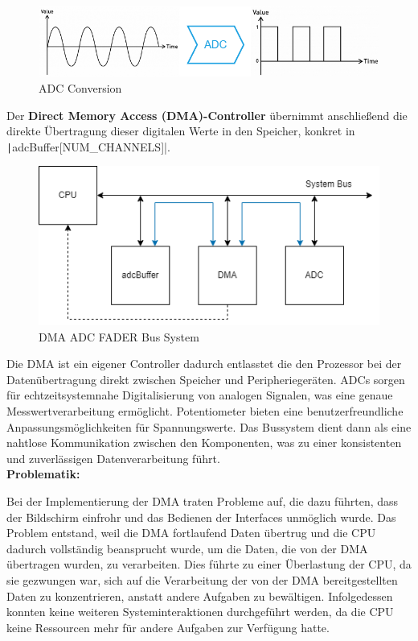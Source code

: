 \begin{figure}[H]
	\centering
	\includegraphics[width=1.0\textwidth]{images/08_durchfuehrung/interface/Conversion.drawio.png}
	\caption{ADC Conversion}
	\label{fig:conversion}
\end{figure}

Der \textbf{Direct Memory Access (DMA)-Controller} übernimmt anschließend die direkte Übertragung dieser digitalen Werte in den Speicher, konkret in  \texttt|adcBuffer[NUM_CHANNELS]|.

\begin{figure}[H]
\centering
\includegraphics[width=1.0\textwidth]{images/08_durchfuehrung/interface/DMA_ADC_MEM.drawio.png}
\caption{DMA ADC FADER Bus System}
\label{fig:DMA ADC FADER}
\end{figure}

Die DMA ist ein eigener Controller dadurch entlasstet die den Prozessor bei der Datenübertragung direkt zwischen Speicher und Peripheriegeräten.
ADCs sorgen für echtzeitsystemnahe Digitalisierung von analogen Signalen, was eine genaue Messwertverarbeitung ermöglicht. Potentiometer bieten eine benutzerfreundliche Anpassungsmöglichkeiten für Spannungswerte. Das Bussystem dient dann als eine nahtlose Kommunikation zwischen den Komponenten, was zu einer konsistenten und zuverlässigen Datenverarbeitung führt.\\

\textbf{Problematik:}

Bei der Implementierung der DMA traten Probleme auf, die dazu führten, dass der Bildschirm einfrohr und das Bedienen der Interfaces unmöglich wurde. Das Problem entstand, weil die DMA fortlaufend Daten übertrug und die CPU dadurch vollständig beansprucht wurde, um die Daten, die von der DMA übertragen wurden, zu verarbeiten. Dies führte zu einer Überlastung der CPU, da sie gezwungen war, sich auf die Verarbeitung der von der DMA bereitgestellten Daten zu konzentrieren, anstatt andere Aufgaben zu bewältigen. Infolgedessen konnten keine weiteren Systeminteraktionen durchgeführt werden, da die CPU keine Ressourcen mehr für andere Aufgaben zur Verfügung hatte.

